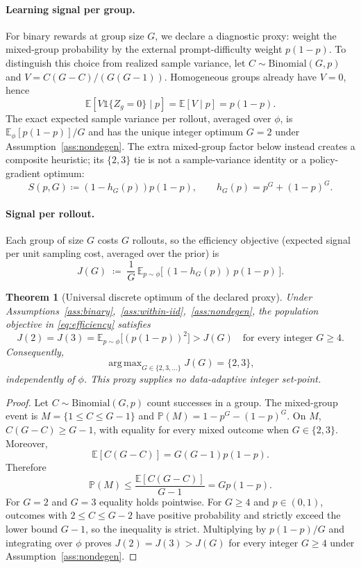 \documentclass[11pt]{article}
\theoremstyle{plain}
\newtheorem{theorem}{Theorem}
\theoremstyle{definition}
\theoremstyle{remark}
\newcommand{\E}{\mathbb{E}}
\newcommand{\Prob}{\mathbb{P}}
\newcommand{\1}{\mathbb{1}}
\DeclareMathOperator*{\argmax}{arg\,max}
\begin{document}
\paragraph{Learning signal per group.} For binary rewards at group size $G$,
we declare a diagnostic proxy: weight the mixed-group probability by the
external prompt-difficulty weight $p(1-p)$. To distinguish this choice from
realized sample variance, let $C\sim\mathrm{Binomial}(G,p)$ and
$V=C(G-C)/(G(G-1))$. Homogeneous groups already have $V=0$, hence
\[
\E[V\1\{Z_g=0\}\mid p]=\E[V\mid p]=p(1-p).
\]
The exact expected sample variance per rollout, averaged over $\phi$, is
$\E_\phi[p(1-p)]/G$ and has the unique integer optimum $G=2$ under
Assumption~\ref{ass:nondegen}. The extra mixed-group factor below instead
creates a composite heuristic; its $\{2,3\}$ tie is not a sample-variance
identity or a policy-gradient optimum:
\begin{equation}\label{eq:signal-per-group}
S(p,G)\coloneqq (1-h_G(p))p(1-p),\qquad h_G(p)=p^G+(1-p)^G.
\end{equation}

\paragraph{Signal per rollout.} Each group of size $G$ costs $G$ rollouts, so
the efficiency objective (expected signal per unit sampling cost, averaged over
the prior) is
\begin{equation}\label{eq:efficiency}
J(G) \;\coloneqq\; \frac{1}{G}\,
\E_{p\sim\phi}\!\big[\,(1-h_G(p))\,p(1-p)\,\big].
\end{equation}

\begin{theorem}[Universal discrete optimum of the declared proxy]\label{thm:T3}
Under Assumptions~\ref{ass:binary},~\ref{ass:within-iid},~\ref{ass:nondegen},
the population objective in \eqref{eq:efficiency} satisfies
\begin{equation}\label{eq:J23}
J(2)=J(3)=\E_{p\sim\phi}\big[(p(1-p))^2\big]>J(G)
\quad\text{for every integer }G\ge4.
\end{equation}
Consequently,
\begin{equation}\label{eq:Gstar}
\argmax_{G\in\{2,3,\dots\}} J(G)=\{2,3\},
\end{equation}
independently of $\phi$. This proxy supplies no data-adaptive integer set-point.
\end{theorem}
\begin{proof}
Let $C\sim\mathrm{Binomial}(G,p)$ count successes in a group. The mixed-group
event is $M=\{1\le C\le G-1\}$ and
$\Prob(M)=1-p^G-(1-p)^G$. On $M$,
$C(G-C)\ge G-1$, with equality for every mixed outcome when $G\in\{2,3\}$.
Moreover,
\[
\E[C(G-C)]=G(G-1)p(1-p).
\]
Therefore
\[
\Prob(M)\le\frac{\E[C(G-C)]}{G-1}=G p(1-p).
\]
For $G=2$ and $G=3$ equality holds pointwise. For $G\ge4$ and
$p\in(0,1)$, outcomes with $2\le C\le G-2$ have positive probability and
strictly exceed the lower bound $G-1$, so the inequality is strict. Multiplying
by $p(1-p)/G$ and integrating over $\phi$ proves
$J(2)=J(3)>J(G)$ for every integer $G\ge4$ under
Assumption~\ref{ass:nondegen}.
\end{proof}
\end{document}
